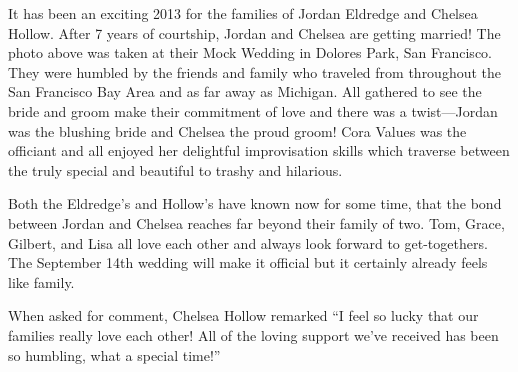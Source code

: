 It has been an exciting 2013 for the families of Jordan Eldredge and
Chelsea Hollow. After 7 years of courtship, Jordan and Chelsea are getting
married! The photo above was taken at their Mock Wedding in Dolores Park,
San Francisco. They were humbled by the friends and family who
traveled from throughout the San Francisco Bay Area and as far away as
Michigan. All gathered to see the bride and groom make their commitment of
love and there was a twist---Jordan was the blushing bride and Chelsea the
proud groom! Cora Values was the officiant and all enjoyed her delightful
improvisation skills which traverse between the truly special and beautiful
to trashy and hilarious.

Both the Eldredge's and Hollow's have known now for some time, that the
bond between Jordan and Chelsea reaches far beyond their family of two.
Tom, Grace, Gilbert, and Lisa all love each other and always look forward
to get-togethers. The September 14th wedding will make it official but it
certainly already feels like family.

When asked for comment, Chelsea Hollow remarked ``I feel so lucky that our
families really love each other! All of the loving support we've received
has been so humbling, what a special time!''
